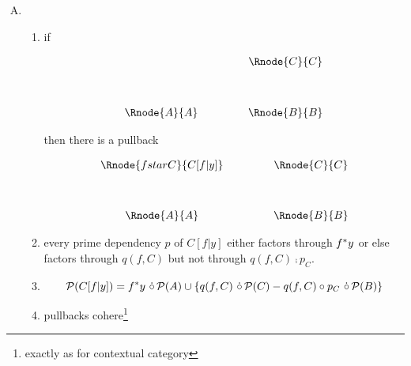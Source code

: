 \documentclass[10pt,a4paper]{scrartcl}
\begin{document}
\begin{enumerate} [A.,leftmargin=0.5cm]
\item  
\begin{enumerate}[label*=\arabic*]
\item 
{}
	if
\begin{center}
\begin{displaymath}
\begin{array}{cp{.9cm}c}
            & & \Rnode{C}{C} \\ [1.2cm]
\Rnode{A}{A}& & \Rnode{B}{B} \\
\end{array}
\end{displaymath}
\end{center}

then there is a pullback 
\vspace{3mm}
\begin{center}
\begin{displaymath}
\begin{array}{cp{.9cm}c}
\Rnode{fstarC}{C[f|y]} & & \Rnode{C}{C}\\ [1.2cm]
\Rnode{A}{A}         & & \Rnode{B}{B}
\end{array}
\end{displaymath}
\end{center}
\item 
{}
every prime dependency $p$ of $C[f|y]$ either factors through $f ^* y$ or else factors 
through $q(f,C)$ but not through $q(f,C) \comp p_C$. 
\item 
{}

$$\mathcal{P}(C[f|y])= f ^* y \ \dot{\circ}\, \mathcal{P}(A) \cup \{ q(f,C) \ \dot{\circ}\, \mathcal{P}(C) - q(f,C) \circ p_C \ \dot{\circ}\, \mathcal{P}(B)\}$$
\item 
{}

pullbacks cohere\footnote{exactly as for contextual category}


\end{enumerate}
\end{enumerate}
\end{document}
